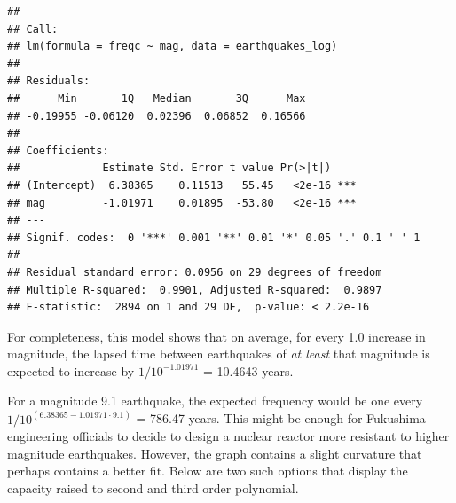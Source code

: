 \begin{Shaded}
\begin{Highlighting}[]
\OtherTok{\textless{}{-}}\SpecialCharTok{\%\textgreater{}\%} \NormalTok{(} 

\OtherTok{\textless{}{-}} \NormalTok{(}\SpecialCharTok{\textasciitilde{}}

\end{Highlighting}
\end{Shaded}

\begin{verbatim}
## 
## Call:
## lm(formula = freqc ~ mag, data = earthquakes_log)
## 
## Residuals:
##      Min       1Q   Median       3Q      Max 
## -0.19955 -0.06120  0.02396  0.06852  0.16566 
## 
## Coefficients:
##             Estimate Std. Error t value Pr(>|t|)    
## (Intercept)  6.38365    0.11513   55.45   <2e-16 ***
## mag         -1.01971    0.01895  -53.80   <2e-16 ***
## ---
## Signif. codes:  0 '***' 0.001 '**' 0.01 '*' 0.05 '.' 0.1 ' ' 1
## 
## Residual standard error: 0.0956 on 29 degrees of freedom
## Multiple R-squared:  0.9901, Adjusted R-squared:  0.9897 
## F-statistic:  2894 on 1 and 29 DF,  p-value: < 2.2e-16
\end{verbatim}


For completeness, this model shows that on average, for every 1.0 increase in magnitude, the lapsed time between earthquakes of \emph{at least} that magnitude is expected to increase by \(1/10^{-1.01971}\) = 10.4643 years.

For a magnitude 9.1 earthquake, the expected frequency would be one
every \(1/10^{(6.38365 - 1.01971 \cdot 9.1)}\) = 786.47 years.  This might be enough for Fukushima engineering officials to decide to design a nuclear reactor more resistant to higher magnitude earthquakes.  However, the graph contains a slight curvature that perhaps contains a better fit.  Below are two such options that display the capacity raised to second and third order polynomial.

